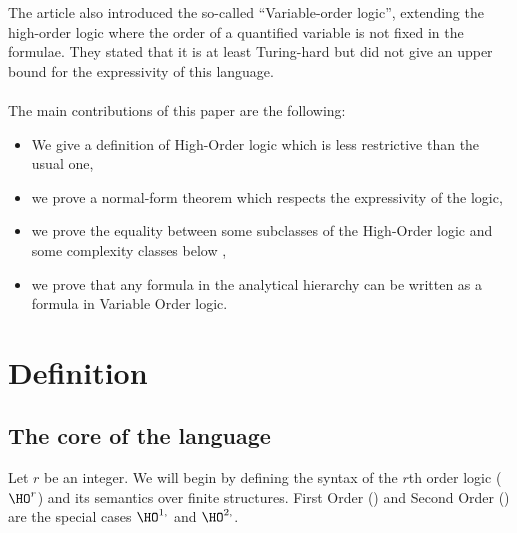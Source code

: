\documentclass[a4paper,12pt]{article}
\theoremstyle{definition}
\newcommand{\hoa}[1]{\ensuremath{\HO^{#1}}}
\newcommand{\hod}[2]{\ensuremath{\HO^{#1,#2}}}
\begin{document}
The article \cite{lauri} also introduced the so-called ``Variable-order logic'',
extending the high-order logic where the order of a quantified
variable is not fixed in the formulae. They stated that it is at least
Turing-hard but did not give an upper bound for the expressivity of this
language.

\paragraph{}
The main contributions of this paper are the following:
\begin{itemize}
\item We give a definition of High-Order logic which is less
  restrictive than the usual one,
\item we prove a normal-form theorem which respects the expressivity of
  the logic,
\item we prove the equality between some subclasses of the High-Order
  logic and some complexity classes below \ELEMENTARY{},
\item we prove that any formula in the analytical hierarchy can be
  written as a formula in Variable Order logic.
\end{itemize}





\section{Definition}\label{def}

\subsection{The core of the language}
Let $r$ be an integer. We will begin by defining the syntax of the
$r$th order logic (\hoa r) and its semantics over finite
structures. First Order (\FO) and Second Order (\SO) are the special
cases \hod{1}{} and \hod{2}{}.
\end{document}
